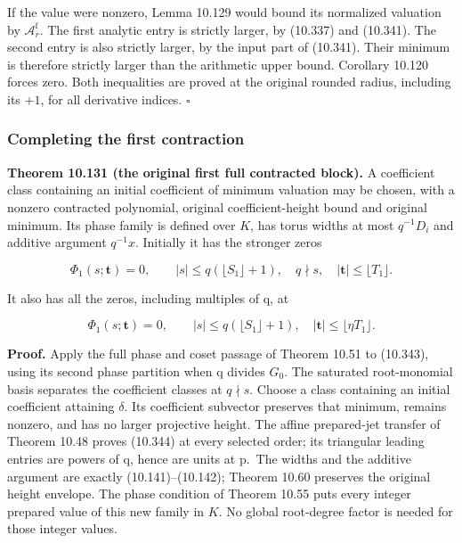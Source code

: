 \documentclass[
  11pt,
  a4paper,
]{article}
\begin{document}
If the value were nonzero, Lemma 10.129 would bound its normalized
valuation by \(\mathcal A_r^{\mathrm f}\). The first analytic entry is
strictly larger, by (10.337) and (10.341). The second entry is also
strictly larger, by the input part of (10.341). Their minimum is
therefore strictly larger than the arithmetic upper bound. Corollary
10.120 forces zero. Both inequalities are proved at the original rounded
radius, including its \(+1\), for all derivative indices. \(\square\)

\subsubsection{Completing the first
contraction}\label{completing-the-first-contraction}

\textbf{Theorem 10.131 (the original first full contracted block).} A
coefficient class containing an initial coefficient of minimum valuation
may be chosen, with a nonzero contracted polynomial, original
coefficient-height bound and original minimum. Its phase family is
defined over \(K\), has torus widths at most \(q^{-1}D_i\) and additive
argument \(q^{-1}x\). Initially it has the stronger zeros

\[
\Phi_1(s;\boldsymbol t)=0,
\qquad |s|\le q(\lfloor S_1\rfloor+1),\quad q\nmid s,
\quad |\boldsymbol t|\le\lfloor T_1\rfloor.
\tag{10.344}
\]

It also has all the zeros, including multiples of q, at

\[
\Phi_1(s;\boldsymbol t)=0,
\qquad |s|\le q(\lfloor S_1\rfloor+1),
\quad |\boldsymbol t|\le\lfloor\eta T_1\rfloor.
\tag{10.345}
\]

\textbf{Proof.} Apply the full phase and coset passage of Theorem 10.51
to (10.343), using its second phase partition when q divides \(G_0\).
The saturated root-monomial basis separates the coefficient classes at
\(q\nmid s\). Choose a class containing an initial coefficient attaining
\(\delta\). Its coefficient subvector preserves that minimum, remains
nonzero, and has no larger projective height. The affine prepared-jet
transfer of Theorem 10.48 proves (10.344) at every selected order; its
triangular leading entries are powers of q, hence are units at p.~The
widths and the additive argument are exactly (10.141)--(10.142); Theorem
10.60 preserves the original height envelope. The phase condition of
Theorem 10.55 puts every integer prepared value of this new family in
\(K\). No global root-degree factor is needed for those integer values.
\end{document}
